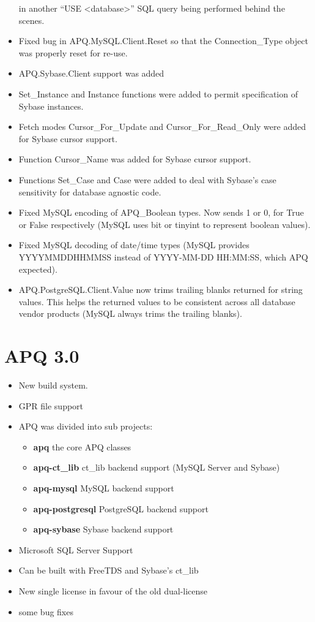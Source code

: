 \documentclass[english,letterpaper]{book}
\begin{document}
\begin{itemize}
         in another ``USE <database>'' SQL query being performed behind
         the scenes.
   \item Fixed bug in APQ\-.MySQL\-.Client\-.Reset so that the Connection\_Type object
         was properly reset for re-use.
   \item APQ.Sybase.Client support was added
   \item Set\_Instance and Instance functions were added to permit specification
         of Sybase instances.
   \item Fetch modes Cursor\_For\_Update and Cursor\_For\_Read\_Only were added
         for Sybase cursor support.
   \item Function Cursor\_Name was added for Sybase cursor support.
   \item Functions Set\_Case and Case were added to deal with Sybase's case
         sensitivity for database agnostic code.
   \item Fixed MySQL encoding of APQ\_Boolean types. Now sends 1 or 0, for
         True or False respectively (MySQL uses bit or tinyint to represent
         boolean values).
   \item Fixed MySQL decoding of date/time types (MySQL provides YYYYMMDDHHMMSS
         instead of YYYY-MM-DD HH:MM:SS, which APQ expected).
   \item APQ.PostgreSQL.Client.Value now trims trailing blanks returned for
         string values. This helps the returned values to be consistent across
         all database vendor products (MySQL always trims the trailing blanks).
\end{itemize}

\section*{APQ 3.0}
\begin{itemize}
	\item New build system.
	\item GPR file support
	\item APQ was divided into sub projects:
		\begin{itemize}
			\item \textbf{apq} the core APQ classes
			\item \textbf{apq-ct\_lib} ct\_lib backend support (MySQL Server and Sybase)
			\item \textbf{apq-mysql} MySQL backend support
			\item \textbf{apq-postgresql} PostgreSQL backend support
			\item \textbf{apq-sybase} Sybase backend support
		\end{itemize}
	\item Microsoft SQL Server Support
	\item Can be built with FreeTDS and Sybase's ct\_lib
	\item New single license in favour of the old dual-license
	\item some bug fixes
\end{itemize}


\printindex
\end{document}

